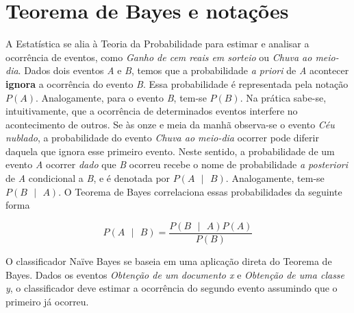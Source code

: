\appendix

\chapter{Teorema de Bayes e notações}

A Estatística se alia à Teoria da Probabilidade para estimar e analisar a ocorrência de eventos, como \emph{Ganho de cem reais em sorteio} ou \emph{Chuva ao meio-dia}. Dados dois eventos \emph{A} e \emph{B}, temos que a probabilidade \emph{a priori} de \emph{A} acontecer \textbf{ignora} a ocorrência do evento \emph{B}. Essa probabilidade é representada pela notação \ensuremath{P(A)}. Analogamente, para o evento \emph{B}, tem-se \ensuremath{P(B)}. Na prática sabe-se, intuitivamente, que a ocorrência de determinados eventos interfere no acontecimento de outros. Se às onze e meia da manhã observa-se o evento \emph{Céu nublado}, a probabilidade do evento \emph{Chuva ao meio-dia} ocorrer pode diferir daquela que ignora esse primeiro evento. Neste sentido, a probabilidade de um evento \emph{A} ocorrer \emph{dado} que \emph{B} ocorreu recebe o nome de probabilidade \emph{a posteriori} de \emph{A} condicional a \emph{B}, e é denotada por \ensuremath{P(A\mbox{ }|\mbox{ }B)}. Analogamente, tem-se \ensuremath{P(B\mbox{ }|\mbox{ }A)}. O Teorema de Bayes correlaciona essas probabilidades da seguinte forma 

\begin{equation}
\label{bayes-apendice}
\ensuremath{P(A\mbox{ }|\mbox{ }B) = \frac{P(B\mbox{ }|\mbox{ }A)P(A)}{P(B)}} 
\end{equation}

O classificador Naïve Bayes se baseia em uma aplicação direta do Teorema de Bayes. Dados os eventos \emph{Obtenção de um documento x} e \emph{Obtenção de uma classe y}, o classificador deve estimar a ocorrência do segundo evento assumindo que o primeiro já ocorreu.   

